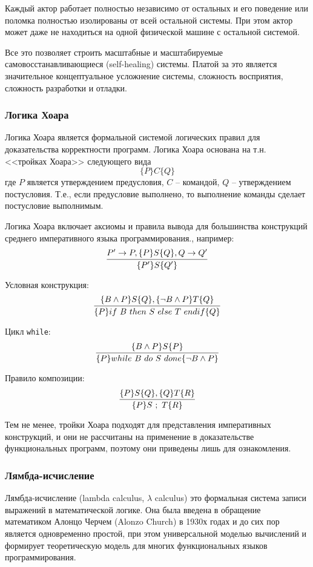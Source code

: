 \documentclass[a4paper,14pt]{extreport} %
\begin{document}
Каждый актор работает полностью независимо от остальных и его поведение или поломка полностью изолированы от всей остальной системы. При этом актор может даже не находиться на одной физической машине с остальной системой.

Все это позволяет строить масштабные и масштабируемые самовосстанавливающиеся (self-healing) системы. Платой за это является значительное концептуальное усложнение системы, сложность восприятия, сложность разработки и отладки.



{\subsubsection{Логика Хоара}}

Логика Хоара является формальной системой логических правил для доказательства корректности программ. Логика Хоара основана на т.н. <<тройках Хоара>> следующего вида
$$\{ P \} C \{ Q \}$$
где $P$ является утверждением предусловия, $C$ -- командой, $Q$ -- утверждением постусловия. Т.е., если предусловие выполнено, то выполнение команды сделает постусловие выполнимым.

Логика Хоара включает аксиомы и правила вывода для большинства конструкций среднего императивного языка программирования., например:
$$
\infer{\{P'\}S\{Q'\}}{%
    P' \rightarrow P, \{P\} S \{Q\}, Q \rightarrow Q'
}
$$

Условная конструкция:
$$
\infer{\{P\} if \ B \ then \ S \ else \ T \ endif \{Q\}}{%
    \{B \wedge P \} S \{Q\}, \{ \lnot B \wedge P \} T \{ Q \}
}
$$

Цикл \texttt{while}:
$$
\infer{\{P\} while \ B \ do \ S \ done \{ \lnot B \wedge P \}}{%
    \{B \wedge P \} S \{P\}
}
$$

Правило композиции:
$$
\infer{\{P\} S \ ; \ T \{ R \}}{%
    \{P \} S \{Q\}, \{Q \} T \{R\}
}
$$

Тем не менее, тройки Хоара подходят для представления императивных конструкций, и они не рассчитаны на применение в доказательстве функциональных программ, поэтому они приведены лишь для ознакомления.


{\subsubsection{Лямбда-исчисление}}

Лямбда-исчисление (lambda calculus, $\lambda$ calculus) это формальная система записи выражений в математической логике. Она была введена в обращение математиком Алонцо Черчем (Alonzo Church) в 1930х годах и до сих пор является одновременно простой, при этом универсальной  моделью вычислений и формирует теоретическую модель для многих функциональных языков программирования.
\end{document}
